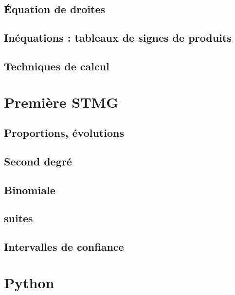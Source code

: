\documentclass[a4paper,12pt]{book}
\begin{document}
\chapter{Équation de droites}


\chapter{Inéquations : tableaux de signes de produits}


\chapter{Techniques de calcul}


\part{Première STMG}
\chapter{Proportions, évolutions}


\chapter{Second degré}


\chapter{Binomiale}


\chapter{suites}


\chapter{Intervalles de confiance}



\part{Python}

\end{document}
